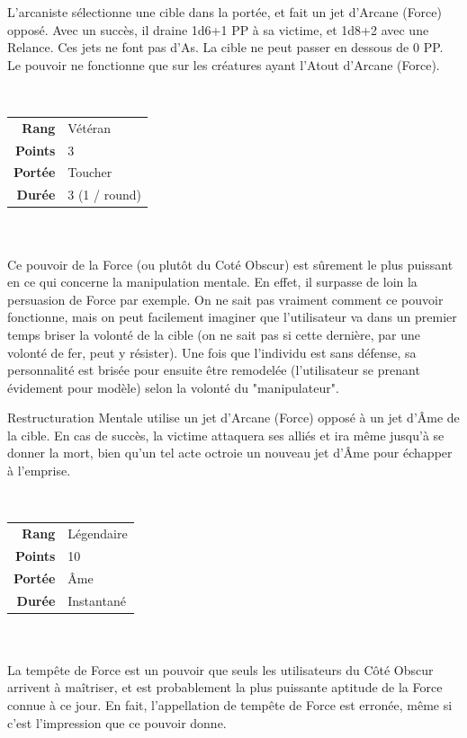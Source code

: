 \begin{description}[align=left]
        L’arcaniste sélectionne une cible dans la portée, et fait un jet d’Arcane (Force) opposé. Avec un succès, il draine 1d6+1 PP à sa victime, et 1d8+2 avec une Relance. Ces jets ne font pas d’As. La cible ne peut passer en dessous de 0 PP. Le pouvoir ne fonctionne que sur les créatures ayant l’Atout d’Arcane (Force).
        \\

    \item [Restructuration Mentale] ~ \\

        \begin{tabular}{ r l }
            \textbf{Rang}    & Vétéran \\
            \textbf{Points}  & 3 \\
            \textbf{Portée}  & Toucher \\
            \textbf{Durée}   & 3 (1 / round) \\
        \end{tabular}
        \\ \\
        Ce pouvoir de la Force (ou plutôt du Coté Obscur) est sûrement le plus puissant en ce qui concerne la manipulation mentale. En effet, il surpasse de loin la persuasion de Force par exemple. On ne sait pas vraiment comment ce pouvoir fonctionne, mais on peut facilement imaginer que l’utilisateur va dans un premier temps briser la volonté de la cible (on ne sait pas si cette dernière, par une volonté de fer, peut y résister). Une fois que l’individu est sans défense, sa personnalité est brisée pour ensuite être remodelée (l’utilisateur se prenant évidement pour modèle) selon la volonté du "manipulateur". 

        Restructuration Mentale utilise un jet d’Arcane (Force) opposé à un jet d’\^Ame de la cible. En cas de succès, la victime attaquera ses alliés et ira même jusqu’à se donner la mort, bien qu’un tel acte octroie un nouveau jet d’\^Ame pour échapper à l’emprise.
        \\

    \item [Tempête de Force] ~ \\

        \begin{tabular}{ r l }
            \textbf{Rang}    & Légendaire \\
            \textbf{Points}  & 10 \\
            \textbf{Portée}  & \^Ame \\
            \textbf{Durée}   & Instantané \\
        \end{tabular}
        \\ \\
        La tempête de Force est un pouvoir que seuls les utilisateurs du Côté Obscur arrivent à maîtriser, et est probablement la plus puissante aptitude de la Force connue à ce jour. En fait, l’appellation de tempête de Force est erronée, même si c’est l’impression que ce pouvoir donne. 


\end{description}
